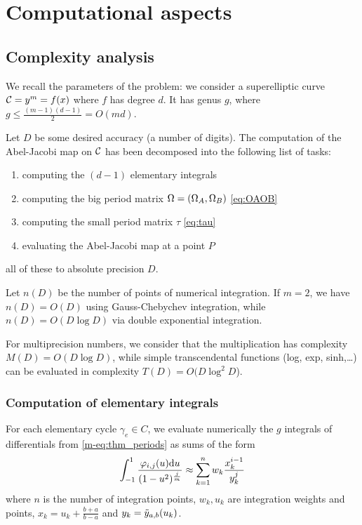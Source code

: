 \documentclass[main.tex]{subfiles}
\begin{document}
  \section{Computational aspects}

   \subsection{Complexity analysis}

   We recall the parameters of the problem: we consider a superelliptic curve
   $\mathcal{C}=y^m=f(x)$ where $f$ has degree $d$. It has genus $g$, where
   $g\leq \frac{(m-1)(d-1)}2=O(md)$.

   Let $D$ be some desired accuracy (a number of digits). The computation of
   the Abel-Jacobi map on $\mathcal{C}$ has been decomposed into the
   following list of tasks:
   \begin{enumerate}
       \item computing the $(d-1)$ elementary integrals
       \item computing the big period matrix $\Omega=(\Omega_A,\Omega_B)$ \eqref{eq:OAOB}
       \item computing the small period matrix $\tau$ \eqref{eq:tau}
       \item evaluating the Abel-Jacobi map at a point $P$
   \end{enumerate}
   all of these to absolute precision $D$.

   Let $n(D)$ be the number of points of numerical integration.
   If $m=2$, we have
   $n(D)=O(D)$ using Gauss-Chebychev integration, while $n(D)=O(D\log D)$
   via double exponential integration.

   For multiprecision numbers, we consider that the multiplication has
   complexity $M(D)=O(D\log D)$,
   while simple transcendental functions (log, exp, sinh,\dots) can be evaluated
   in complexity $T(D)=O(D\log^2 D$).

   \subsubsection{Computation of elementary integrals}

   For each elementary cycle $\gamma_e\in C$, we evaluate numerically the $g$
   integrals of differentials from \eqref{m-eq:thm_periods} as sums of the form
   \begin{equation}
       \int_{-1}^1\frac{\varphi_{i,j}(u)\mathrm d u}{(1-u^2)^{\frac jm}}
           \approx \sum_{k=1}^n w_k\frac{x_k^{i-1}}{y_k^j}
   \end{equation}
   where $n$ is the number of integration points, $w_k,u_k$ are integration weights and points,
   $x_k=u_k+\frac{b+a}{b-a}$ and $y_k=\tilde{y}_{a,b}(u_k)$.
\end{document}
